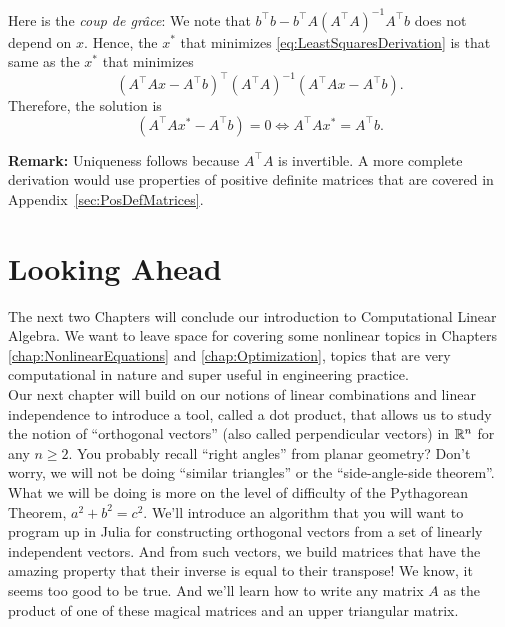 
Here is the \textit{coup de gr\^{a}ce}: We note that $b^\top b - b^\top A \left(A^\top A \right)^{-1}  A^\top b$ does not depend on $x$. Hence, the $x^\ast$ that minimizes \eqref{eq:LeastSquaresDerivation} is that same as the $x^\ast$ that minimizes  
$$ \left( A^\top A x - A^\top b \right)^\top \left(A^\top A \right)^{-1}   \left( A^\top A x - A^\top b \right).$$
Therefore, the solution is
$$\left( A^\top A x^\ast - A^\top b \right)=0 \iff A^\top A x^\ast = A^\top b . $$

\textbf{Remark:} Uniqueness follows because $A^\top A$ is invertible. A more complete derivation would use properties of positive definite matrices that are covered in Appendix~\ref{sec:PosDefMatrices}. 

\section{Looking Ahead}
The next two Chapters will conclude our introduction to Computational Linear Algebra. We want to leave space for covering some nonlinear topics in Chapters \ref{chap:NonlinearEquations} and \ref{chap:Optimization}, topics that are very computational in nature and super useful in engineering practice.\\

Our next chapter will build on our notions of linear combinations and linear independence to introduce a tool, called a dot product, that allows us to study the notion of ``orthogonal vectors'' (also called perpendicular vectors) in $\mathbb R^n$ for any $n \ge 2$. You probably recall ``right angles'' from planar geometry? Don't worry, we will not be doing ``similar triangles'' or the ``side-angle-side theorem''. What we will be doing is more on the level of difficulty of the Pythagorean Theorem, $a^2 + b^2 = c^2$. We'll introduce an algorithm that you will want to program up in Julia for constructing orthogonal vectors from a set of linearly independent vectors. And from such vectors, we build matrices that have the amazing property that their inverse is equal to their transpose! We know, it seems too good to be true. And we'll learn how to write any matrix $A$ as the product of one of these magical matrices and an upper triangular matrix.  






